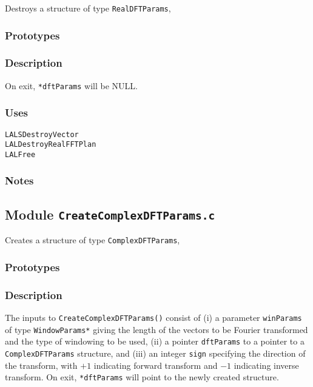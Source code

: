 Destroys a structure of type \verb+RealDFTParams+,

\subsubsection*{Prototypes}
\vspace{0.1in}
%

\subsubsection*{Description}

On exit, \verb+*dftParams+ will be NULL.

\subsubsection*{Uses}
\begin{verbatim}
LALSDestroyVector
LALDestroyRealFFTPlan
LALFree
\end{verbatim}

\subsubsection*{Notes}


\newpage
\subsection{Module \texttt{CreateComplexDFTParams.c}}
\label{ss:CreateComplexDFTParams.c}

Creates a structure of type \verb+ComplexDFTParams+,

\subsubsection*{Prototypes}
\vspace{0.1in}


\subsubsection*{Description}

The inputs to \verb+CreateComplexDFTParams()+ consist of (i) a parameter
\verb+winParams+ of type \verb+WindowParams*+ giving the length of the vectors
to be Fourier  transformed and the type of windowing to be used, (ii) a
pointer \verb+dftParams+ to a pointer to a \verb+ComplexDFTParams+ structure, and
(iii) an integer \verb+sign+ specifying the direction of the transform, with
$+1$ indicating forward transform and $-1$ indicating inverse transform.  On
exit, \verb+*dftParams+ will point to the newly created structure.

